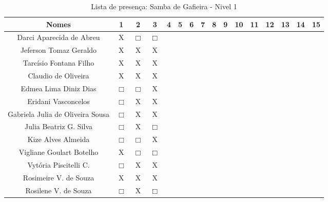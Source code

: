 \documentclass[a4paper,12pt]{article}
\begin{document}
\begin{landscape}

\begin{table}[!htbp]
\vspace*{-2cm}\centering
\caption{Lista de presença: Samba de Gafieira - Nivel 1}
\begin{tabular}{|*{16}{c|}}
\hline%
 Nomes & 1 & 2 & 3 & 4 & 5 & 6 & 7 & 8 & 9 & 10 & 11 & 12 & 13 & 14 & 15  \\ \hline
 
 \LARGE Darci Aparecida de Abreu           &X      &$\Box$ &$\Box$ &  &  &  &  &  &  &  &  &  &  &  &  \\ \hline
 \LARGE Jeferson Tomaz Geraldo             &X      &X      &X      &  &  &  &  &  &  &  &  &  &  &  &  \\ \hline
 \LARGE Tarcísio Fontana Filho             &X      &X      &X      &  &  &  &  &  &  &  &  &  &  &  &  \\ \hline
 
 \LARGE Claudio de Oliveira                &X      &X      &X      &  &  &  &  &  &  &  &  &  &  &  &  \\ \hline
 \LARGE Edmea Lima Diniz Dias              &$\Box$ &$\Box$ &X      &  &  &  &  &  &  &  &  &  &  &  &  \\ \hline
 \LARGE Eridani Vasconcelos                &$\Box$ &X      &X      &  &  &  &  &  &  &  &  &  &  &  &  \\ \hline
 \LARGE Gabriela Julia de Oliveira Sousa   &$\Box$ &X      &X      &  &  &  &  &  &  &  &  &  &  &  &  \\ \hline
 \LARGE Julia Beatriz G. Silva             &$\Box$ &X      &$\Box$ &  &  &  &  &  &  &  &  &  &  &  &  \\ \hline
 \LARGE Kize Alves Almeida                 &$\Box$ &$\Box$ &X      &  &  &  &  &  &  &  &  &  &  &  &  \\ \hline
 \LARGE Vigliane Goulart Botelho           &X      &$\Box$ &$\Box$ &  &  &  &  &  &  &  &  &  &  &  &  \\ \hline
 \LARGE Vytória Piscitelli C.              &$\Box$ &X      &X      &  &  &  &  &  &  &  &  &  &  &  &  \\ \hline
 \LARGE Rosimeire V. de Souza              &X      &X      &X      &  &  &  &  &  &  &  &  &  &  &  &  \\ \hline
 \LARGE Rosilene V. de Souza               &$\Box$ &X      &$\Box$ &  &  &  &  &  &  &  &  &  &  &  &  \\ \hline
 
 \hline
\end{tabular}
\label{actividades}
\end{table}


\end{landscape}
\end{document}
